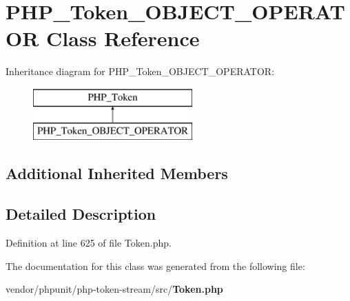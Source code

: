 \section{P\+H\+P\+\_\+\+Token\+\_\+\+O\+B\+J\+E\+C\+T\+\_\+\+O\+P\+E\+R\+A\+T\+O\+R Class Reference}
\label{class_p_h_p___token___o_b_j_e_c_t___o_p_e_r_a_t_o_r}
Inheritance diagram for P\+H\+P\+\_\+\+Token\+\_\+\+O\+B\+J\+E\+C\+T\+\_\+\+O\+P\+E\+R\+A\+T\+O\+R\+:\begin{figure}[H]
\begin{center}
\leavevmode
\includegraphics[height=2.000000cm]{class_p_h_p___token___o_b_j_e_c_t___o_p_e_r_a_t_o_r}
\end{center}
\end{figure}
\subsection*{Additional Inherited Members}


\subsection{Detailed Description}


Definition at line 625 of file Token.\+php.



The documentation for this class was generated from the following file\+:\begin{DoxyCompactItemize}
\item 
vendor/phpunit/php-\/token-\/stream/src/{\bf Token.\+php}\end{DoxyCompactItemize}

